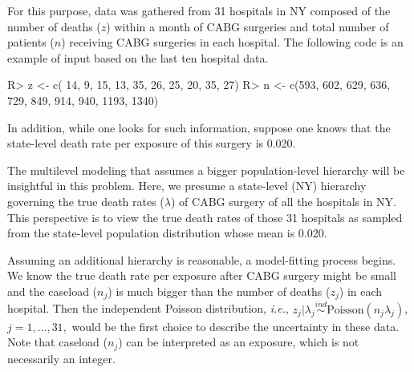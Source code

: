 \documentclass[article]{jss}
\begin{document}
For this purpose, data was gathered from 31 hospitals in NY composed of the number of deaths ($z$) within a month of CABG surgeries and total number of patients ($n$) receiving CABG surgeries in each hospital. The following code is an example of input based on the last ten hospital data.
\begin{CodeChunk}
\begin{CodeInput}
R> z <- c( 14,   9,  15,  13,  35,  26,  25,  20,   35,   27)
R> n <- c(593, 602, 629, 636, 729, 849, 914, 940, 1193, 1340)
\end{CodeInput}
\end{CodeChunk}

In addition, while one looks for such information, suppose one knows that the state-level death rate per exposure of this surgery is 0.020. 


The multilevel modeling that assumes a bigger population-level hierarchy will be insightful in this problem. Here, we presume a state-level (NY) hierarchy governing the true death rates ($\lambda$) of CABG surgery of all the hospitals in NY. This perspective is to view the true death rates of those 31 hospitals as sampled from the state-level population distribution whose mean is 0.020. 


Assuming an additional hierarchy is reasonable, a model-fitting process begins.  We know the true death rate per exposure after CABG surgery might be small and the caseload ($n_{j}$) is much bigger than the number of deaths ($z_{j}$) in each hospital. Then the independent Poisson distribution, \emph{i.e.},  $z_{j}\vert \lambda_{j}\stackrel{ind}{\sim} \textrm{Poisson}(n_{j}\lambda_{j})$, $j=1, \ldots, 31,$ would be the first choice to describe the uncertainty in these data. Note that caseload  ($n_{j}$) can be interpreted as an exposure, which is not necessarily an integer.
\end{document}
